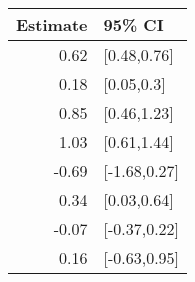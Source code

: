 \begin{tabular}{rl}
  \hline
Estimate & 95\% CI \\ 
  \hline
0.62 & [0.48,0.76] \\ 
  0.18 & [0.05,0.3] \\ 
  0.85 & [0.46,1.23] \\ 
  1.03 & [0.61,1.44] \\ 
  -0.69 & [-1.68,0.27] \\ 
  0.34 & [0.03,0.64] \\ 
  -0.07 & [-0.37,0.22] \\ 
  0.16 & [-0.63,0.95] \\ 
   \hline
\end{tabular}


